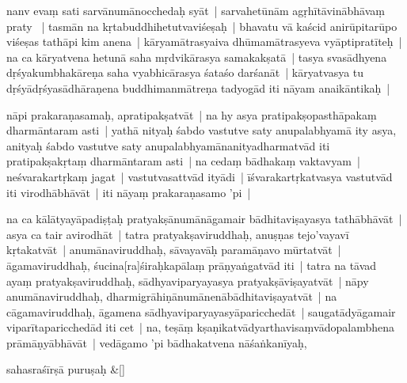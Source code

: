 \documentclass[article,12pt,a4paper]{memoir}
\newcommand{\add}[1]{($^{+}$#1)}
\begin{document}
	  \pstart nanv evaṃ sati sarvānumānocchedaḥ syāt | sarvahetūnām agṛhītāvinābhāvaṃ praty \edtext{agamakatvāt}{\Afootnote{agama\add{ka}tvāt \cite{} ; agamakatvāt \cite{thakur75} }} | tasmān na \label{rnā__99759}kṛtabuddhihetutvaviśeṣaḥ\label{rnā__99814} | bhavatu vā kaścid anirūpitarūpo viśeṣas tathāpi kim anena | kāryamātrasyaiva dhūmamātrasyeva vyāptipratīteḥ | na ca kāryatvena hetunā saha mṛdvikārasya samakakṣatā | tasya svasādhyena dṛśyakumbhakāreṇa saha vyabhicārasya śataśo darśanāt | kāryatvasya tu dṛśyādṛśyasādhāraṇena buddhimanmātreṇa tadyogād iti nāyam anaikāntikaḥ |
	\pend
      

	  \pstart nāpi prakaraṇasamaḥ, apratipakṣatvāt | na hy asya pratipakṣopasthāpakaṃ dharmāntaram asti | \label{RNAms-add-1-start}yathā nityaḥ śabdo vastutve saty anupalabhyamā ity asya, anityaḥ śabdo vastutve saty anupalabhyamānanityadharmatvād iti pratipakṣakṛtaṃ dharmāntaram asti |\label{RNAms-add-1-end} na cedaṃ bādhakaṃ vaktavyam | neśvarakartṛkaṃ jagat | vastutvasattvād ityādi | īśvarakartṛkatvasya vastutvād iti virodhābhāvāt | iti nāyaṃ prakaraṇasamo 'pi |
	\pend
      

	  \pstart na ca kālātyayāpadiṣṭaḥ pratyakṣānumānāgamair bādhitaviṣayasya tathābhāvāt | asya ca tair avirodhāt | tatra pratyakṣaviruddhaḥ, anuṣṇas tejo'vayavī kṛtakatvāt | anumānavi\leavevmode{}\label{RNAms_22a}ruddhaḥ, sāvayavāḥ paramāṇavo mūrtatvāt | āgamaviruddhaḥ, śucina[ra]śiraḥkapālaṃ prāṇyaṅgatvād iti | tatra na tāvad ayaṃ pratyakṣaviruddhaḥ, sādhyaviparyayasya pratyakṣāviṣayatvāt | nāpy anumānaviruddhaḥ, dharmigrāhiṇānumānenābādhitaviṣayatvāt | na cāgamaviruddhaḥ, āgamena sādhyaviparyayasyāparicchedāt | saugatādyāgamair viparītaparicchedād iti cet | na, teṣāṃ kṣaṇikatvādyarthavisaṃvādopalambhena prāmāṇyābhāvāt | vedāgamo 'pi bādhakatvena nāśaṅkanīyaḥ,
	\pend
      
	    
	    \stanza[\smallbreak]
	sahasraśīrṣā puruṣaḥ \&[\smallbreak]
\end{document}
